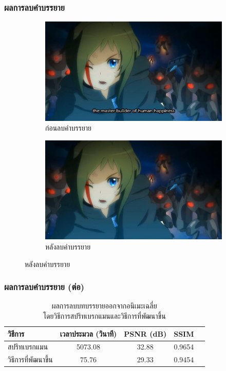 \documentclass[xcolor=dvipsnames, xetex,serif]{beamer}
\numberwithin{equation}{section}
\begin{document}
    \begin{frame}
        \frametitle{ผลการลบคำบรรยาย}
        \begin{figure}[H]
            \centering
            \begin{subfigure}{0.4\linewidth}
                \centering
                \includegraphics[width=0.80\linewidth]{images/subtitle-remove/beforesubtitleremove.png}
                \caption{ก่อนลบคำบรรยาย}
                \label{image:ssim_location_prev}
            \end{subfigure}
            \begin{subfigure}{0.4\linewidth}
                \centering
                \includegraphics[width=0.80\linewidth]{images/subtitle-remove/aftersubtitleremove.png}
                \caption{หลังลบคำบรรยาย}
                \label{image:ssim_location_curr}
            \end{subfigure}
        \end{figure}
    \end{frame}
    \begin{frame}
        \frametitle{ผลการลบคำบรรยาย (ต่อ)}
        \begin{table}[H]
            \centering
            \captionsetup{justification=centering}
            \begin{tabular}[ht]{|l|c|c|c|c|}
                \hline
                วิธีการ  & เวลาประมวล  (วินาที) & PSNR (dB) & SSIM \\
                \hline
                สปริทเบรกแมน & 5073.08 & 32.88 & 0.9654 \\
                วิธีการที่พัฒนาขึ้น & 75.76 & 29.33 & 0.9454 \\
                \hline
            \end{tabular}
            \caption{ผลการลบบทบรรยายออกจากอนิเมะเฉลี่ย\\โดยวิธีการสปริทเบรกแมนและวิธีการที่พัฒนาขึ้น}
        \end{table}	
    \end{frame}
\end{document}
